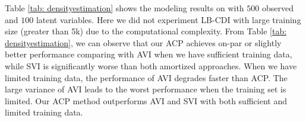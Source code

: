 \begin{table}[t]
\caption{\small Generative modeling on \sparse, where $D=500$, $K=100$, $sparsity=89.2\%$}
\label{tab: densityestimation}
\centering
{}
\end{table}

Table \ref{tab: densityestimation} shows the modeling results on \sparse with $500$ observed and $100$ latent variables. Here we did not experiment LB-CDI with large training size (greater than 5k) due to the computational complexity. From Table \ref{tab: densityestimation}, we can observe that our ACP achieves on-par or slightly better performance comparing with AVI when we have sufficient training data, while SVI is significantly worse than both amortized approaches. When we have limited training data, the performance of AVI degrades faster than ACP. The large variance of AVI leads to the worst performance when the training set is limited. Our ACP method outperforms AVI and SVI with both sufficient and limited training data.


